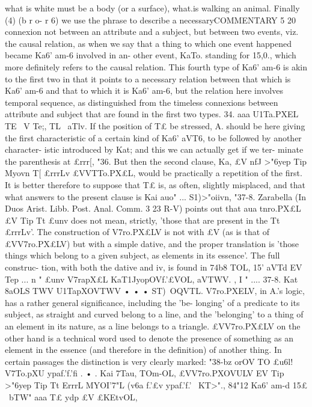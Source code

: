 {{{{what is white must be a body (or a surface), what.is walking an
animal.
Finally (4) (b r o- r 6) we use the phrase to describe a necessaryCOMMENTARY
5 20
connexion not between an attribute and a subject, but between
two events, viz. the causal relation, as when we say that a thing
to which one event happened became Ka6' am-6 involved in an-
other event, KaTo. standing for 15,0., which more definitely refers
to the causal relation. This fourth type of Ka6' am-6 is akin to
the first two in that it points to a necessary relation between
that which is Ka6' am-6 and that to which it is Ka6' am-6, but the
relation here involves temporal sequence, as distinguished from
the timeless connexions between attribute and subject that are
found in the first two types.
34. aaa U1Ta.PXEL TE ~V Te;, TL ~aTlv. If the position of T£ be
stressed, A. should be here giving the first characteristic of a
certain kind of Ka6' aVT6, to be followed by another character-
istic introduced by Kat; and this we can actually get if we ter-
minate the parenthesis at £rrr[, "36. But then the second clause,
Ka, £V nfJ >"6yep Tip Myovn T[ £rrrLv £VVTTo.PX£L, would be practically
a repetition of the first. It is better therefore to suppose that T£
is, as often, slightly misplaced, and that what answers to the
present clause is Kai auo" ... S1)>"oiivn, "37-8.
Zarabella (In Duos Arist. Libb. Post. Anal. Comm. 3 23 R-V)
points out that aua tnro.PX£L £V Tip Tt £unv does not mean, strictly,
'those that are present in the Tt £rrrLv'. The construction of
V7ro.PX£LV is not with £V (as is that of £VV7ro.PX£LV) but with a simple
dative, and the proper translation is 'those things which belong
to a given subject, as elements in its essence'. The full construc-
tion, with both the dative and iv, is found in 74b8 TOL, 15' aVTd EV
Tep
...
n "
£unv V7rapX£L KaT1JyopOVf.'£VOL, aVTWV.
,
I
"
....
37-8. Kat 8aOLS TWV U1TapXOVTWV • • • ST)~OQVTL. V7ro.PXELV, in
A.'s logic, has a rather general significance, including the 'be-
longing' of a predicate to its subject, as straight and curved
belong to a line, and the 'belonging' to a thing of an element in
its nature, as a line belongs to a triangle. £VV7ro.PX£LV on the other
hand is a technical word used to denote the presence of something
as an element in the essence (and therefore in the definition) of
another thing. In certain passages the distinction is very clearly
marked: "38-bz orOV TO £u6l! V7To.pXU ypaf.'f.'fi . • . Kai 7Tau,
TOm-OL, £VV7ro.PXOVULV EV Tip >"6yep Tip Tt ErrrL MYOI'7"L (v6a f.'£v
ypaf.'f.'~ KT>"., 84"12 Ka6' am-d 15£ ~bTW" aaa T£ ydp £V £KEtvOL,
}}}}
